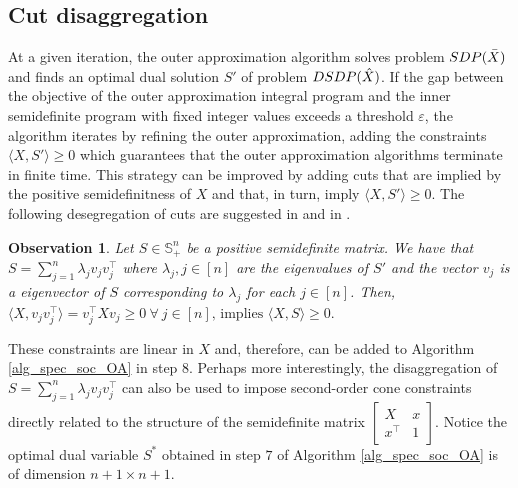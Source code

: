 \documentclass{article}
\newtheorem{observation}{Observation}
\begin{document}
\subsection{Cut disaggregation}\label{subsec:dissagregations}

At a given iteration, the outer approximation algorithm 
solves problem $SDP(\Bar{X})$ and finds an optimal dual solution $S'$ of problem $DSDP(\Hat{X})$. If the gap between the objective of the outer approximation integral program and the inner semidefinite program with fixed integer values exceeds a threshold $\varepsilon$, the algorithm iterates by refining the outer approximation, adding the constraints $\langle X, S'\rangle \geq 0$ which guarantees that the outer approximation algorithms terminate in finite time. This strategy can be improved by adding cuts that are implied by the positive semidefinitness of $X$ and that, in turn, imply $\langle X, S'\rangle \geq 0$. The following desegregation of cuts are suggested in \cite{de2023instance} and in \cite{coey2020outer}.

\begin{observation}
Let $S \in \mathbb{S}^n_+$ be a positive semidefinite matrix. We have that $S = \sum_{j=1}^n \lambda_jv_jv_j^\top$ where $\lambda_j, j\in [n]$ are the eigenvalues of $S'$ and the vector $v_j$ is a eigenvector of $S$ corresponding to $\lambda_j$ for each $j\in [n]$. Then, \ $ \langle X, v_jv_j^\top \rangle = v_j^\top X v_j \geq 0 \ \forall \ j \in [n] \text{, implies } \langle X,S \rangle \geq 0.$
 
\end{observation}

These constraints are linear in $X$ and, therefore, can be added to Algorithm \ref{alg_spec_soc_OA} in step $8$.
Perhaps more interestingly, the disaggregation of $S = \sum_{j=1}^n \lambda_jv_jv_j^\top$ can also be used to impose second-order cone constraints directly related to the structure of the semidefinite matrix  $\begin{bmatrix}
X & x \\
x^\top & 1 
\end{bmatrix}$. Notice the optimal dual variable $S^*$ obtained in step $7$ of Algorithm \ref{alg_spec_soc_OA} is of dimension $n+1 \times n+1$.
\end{document}

